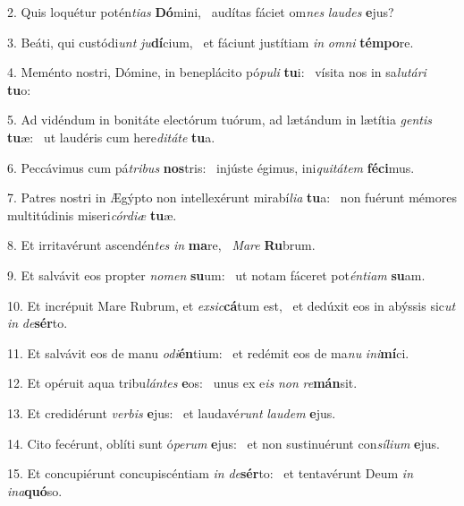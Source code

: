 2. Quis loquétur potén\textit{ti}\textit{as} \textbf{Dó}mini, \ast\  audítas fáciet om\textit{nes} \textit{lau}\textit{des} \textbf{e}jus?\

3. Beáti, qui custódi\textit{unt} \textit{ju}\textbf{dí}cium, \ast\  et fáciunt justítiam \textit{in} \textit{om}\textit{ni} \textbf{tém}\textbf{po}re.\

4. Meménto nostri, Dómine, in beneplácito pó\textit{pu}\textit{li} \textbf{tu}i: \ast\  vísita nos in sa\textit{lu}\textit{tá}\textit{ri} \textbf{tu}o:\

5. Ad vidéndum in bonitáte electórum tuórum, ad lætándum in lætítia \textit{gen}\textit{tis} \textbf{tu}æ: \ast\  ut laudéris cum here\textit{di}\textit{tá}\textit{te} \textbf{tu}a.\

6. Peccávimus cum pá\textit{tri}\textit{bus} \textbf{nos}tris: \ast\  injúste égimus, ini\textit{qui}\textit{tá}\textit{tem} \textbf{fé}\textbf{ci}mus.\

7. Patres nostri in Ægýpto non intellexérunt mirabí\textit{li}\textit{a} \textbf{tu}a: \ast\  non fuérunt mémores multitúdinis miseri\textit{cór}\textit{di}\textit{æ} \textbf{tu}æ.\

8. Et irritavérunt ascendén\textit{tes} \textit{in} \textbf{ma}re, \ast\  \textit{Ma}\textit{re} \textbf{Ru}brum.\

9. Et salvávit eos propter \textit{no}\textit{men} \textbf{su}um: \ast\  ut notam fáceret pot\textit{én}\textit{ti}\textit{am} \textbf{su}am.\

10. Et incrépuit Mare Rubrum, et \textit{ex}\textit{sic}\textbf{cá}tum est, \ast\  et dedúxit eos in abýssis sic\textit{ut} \textit{in} \textit{de}\textbf{sér}to.\

11. Et salvávit eos de manu \textit{o}\textit{di}\textbf{én}tium: \ast\  et redémit eos de ma\textit{nu} \textit{in}\textit{i}\textbf{mí}ci.\

12. Et opéruit aqua tribu\textit{lán}\textit{tes} \textbf{e}os: \ast\  unus ex e\textit{is} \textit{non} \textit{re}\textbf{mán}sit.\

13. Et credidérunt \textit{ver}\textit{bis} \textbf{e}jus: \ast\  et laudavé\textit{runt} \textit{lau}\textit{dem} \textbf{e}jus.\

14. Cito fecérunt, oblíti sunt ó\textit{pe}\textit{rum} \textbf{e}jus: \ast\  et non sustinuérunt con\textit{sí}\textit{li}\textit{um} \textbf{e}jus.\

15. Et concupiérunt concupiscéntiam \textit{in} \textit{de}\textbf{sér}to: \ast\  et tentavérunt Deum \textit{in} \textit{in}\textit{a}\textbf{quó}so.\

